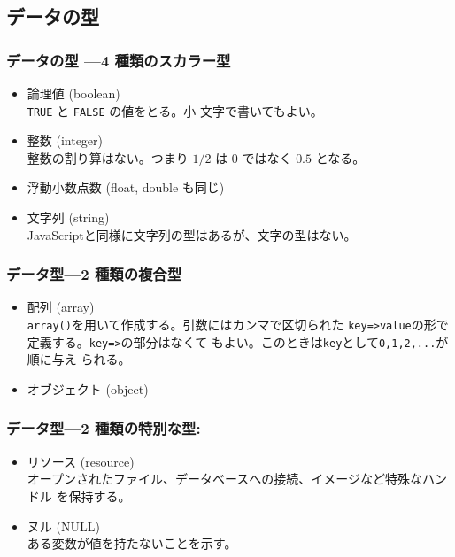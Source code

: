 \subsection{データの型}
\begin{frame}[containsverbatim]
\frametitle{データの型 ---4 種類のスカラー型}
 \begin{itemize}
  \item 論理値 (boolean)\\\texttt{TRUE} と \texttt{FALSE} の値をとる。小
	文字で書いてもよい。
  \item 整数 (integer)\\整数の割り算はない。つまり $1/2$ は $0$ ではなく
	$0.5$ となる。
  \item 浮動小数点数 (float, double も同じ)
  \item 文字列 (string)\\
JavaScriptと同様に文字列の型はあるが、文字の型はない。
 \end{itemize}
\end{frame}
\begin{frame}[containsverbatim]
\frametitle{データ型---2 種類の複合型}
 \begin{itemize}
  \item 配列 (array)\\
\texttt{array()}を用いて作成する。引数にはカンマで区切られた
	\texttt{key=>value}の形で定義する。\texttt{key=>}の部分はなくて
	もよい。このときは\texttt{key}として\texttt{0,1,2,...}が順に与え
	られる。
  \item オブジェクト (object)
 \end{itemize}
\end{frame}
\begin{frame}[containsverbatim]
\frametitle{データ型---2 種類の特別な型:}
\begin{itemize}
 \item リソース (resource)\\
オープンされたファイル、データベースへの接続、イメージなど特殊なハンドル
       を保持する。
 \item ヌル (NULL)\\
ある変数が値を持たないことを示す。
\end{itemize}
\end{frame}
